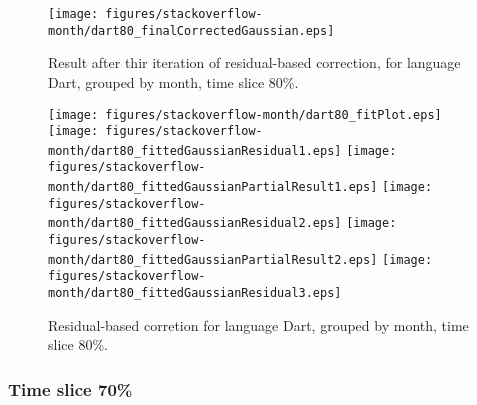 \begin{figure}[]
\centering
{\texttt{[image: figures/stackoverflow-month/dart80\_finalCorrectedGaussian.eps]}}
\caption{Result after thir iteration of residual-based correction, for language Dart, grouped by month, time slice 80\%.}
\end{figure}


\begin{figure}[hb]
\centering
{}
{\texttt{[image: figures/stackoverflow-month/dart80\_fitPlot.eps]}}
{\texttt{[image: figures/stackoverflow-month/dart80\_fittedGaussianResidual1.eps]}}
{\texttt{[image: figures/stackoverflow-month/dart80\_fittedGaussianPartialResult1.eps]}}
{\texttt{[image: figures/stackoverflow-month/dart80\_fittedGaussianResidual2.eps]}}
{\texttt{[image: figures/stackoverflow-month/dart80\_fittedGaussianPartialResult2.eps]}}
{\texttt{[image: figures/stackoverflow-month/dart80\_fittedGaussianResidual3.eps]}}
\caption{Residual-based corretion for language Dart, grouped by month, time slice 80\%.}
\end{figure}


\clearpage 
\newpage 


\FloatBarrier

\subsubsection{Time slice 70\%}

